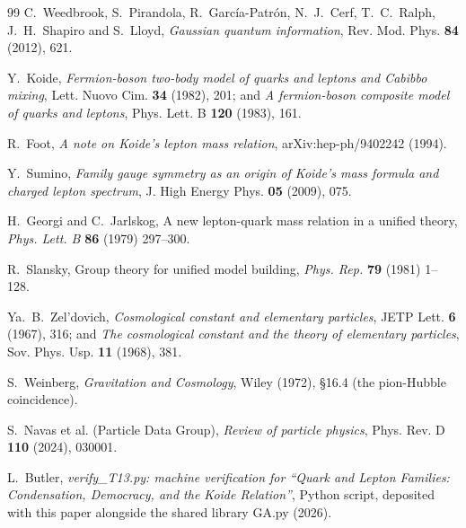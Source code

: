 \documentclass[11pt]{article}
\theoremstyle{definition}
\begin{document}
\begin{thebibliography}{99}
C.~Weedbrook, S.~Pirandola, R.~Garc\'ia-Patr\'on, N.~J.~Cerf, T.~C.~Ralph, J.~H.~Shapiro and S.~Lloyd,
\emph{Gaussian quantum information},
Rev. Mod. Phys. \textbf{84} (2012), 621.

Y.~Koide,
\emph{Fermion-boson two-body model of quarks and leptons and Cabibbo mixing},
Lett. Nuovo Cim. \textbf{34} (1982), 201; and \emph{A fermion-boson composite model of quarks and leptons}, Phys. Lett. B \textbf{120} (1983), 161.

R.~Foot,
\emph{A note on Koide's lepton mass relation},
arXiv:hep-ph/9402242 (1994).

Y.~Sumino,
\emph{Family gauge symmetry as an origin of Koide's mass formula and charged lepton spectrum},
J. High Energy Phys. \textbf{05} (2009), 075.

H.~Georgi and C.~Jarlskog,
A new lepton-quark mass relation in a unified theory,
\emph{Phys. Lett. B} \textbf{86} (1979) 297--300.

R.~Slansky,
Group theory for unified model building,
\emph{Phys. Rep.} \textbf{79} (1981) 1--128.

Ya.~B.~Zel'dovich,
\emph{Cosmological constant and elementary particles},
JETP Lett. \textbf{6} (1967), 316; and \emph{The cosmological constant and the theory of elementary particles}, Sov. Phys. Usp. \textbf{11} (1968), 381.

S.~Weinberg,
\emph{Gravitation and Cosmology},
Wiley (1972), \S16.4 (the pion-Hubble coincidence).

S.~Navas et al. (Particle Data Group),
\emph{Review of particle physics},
Phys. Rev. D \textbf{110} (2024), 030001. %

L.~Butler,
\emph{verify\_T13.py: machine verification for ``Quark and Lepton Families: Condensation, Democracy, and the Koide Relation''},
Python script, deposited with this paper alongside the shared library GA.py (2026).

\end{thebibliography}
\end{document}
